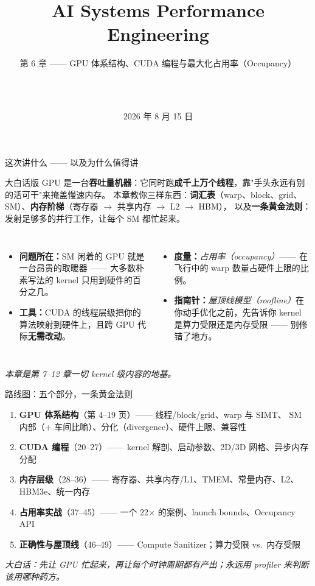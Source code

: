 \documentclass[aspectratio=169]{beamer}
\title[AI Systems Performance Engineering]{AI Systems Performance Engineering}
\subtitle{第 6 章 —— GPU 体系结构、CUDA 编程与最大化占用率（Occupancy）}
\author[\PresenterName\ \ \PresenterTitle\ \ \PresenterOrg]{\PresenterName\\\PresenterTitle\\\PresenterOrg}
\institute[]{\footnotesize 面向应用科学家的 AI 基础设施内部培训}
\date{2026 年 8 月 15 日}
\newcommand{\kw}[1]{\textbf{\textcolor{kwblue}{#1}}}
\newcommand{\pe}[1]{{\footnotesize\itshape 大白话：#1}}
\begin{document}
\begin{frame}
  \titlepage
\end{frame}

\begin{frame}{这次讲什么 —— 以及为什么值得讲}
  \begin{block}{大白话版}
    GPU 是一台\kw{吞吐量机器}：它同时跑\kw{成千上万个线程}，靠"手头永远有别的活可干"来掩盖慢速内存。
    本章教你三样东西：\kw{词汇表}（warp、block、grid、SM）、\kw{内存阶梯}（寄存器 $\to$ 共享内存 $\to$ L2 $\to$ HBM），
    以及\kw{一条黄金法则}：发射足够多的并行工作，让每个 SM 都忙起来。
  \end{block}
  \begin{columns}[t]
    \begin{itemize}
      \item \kw{问题所在：}SM 闲着的 GPU 就是一台昂贵的取暖器 —— 大多数朴素写法的 kernel
            只用到硬件的百分之几。
      \item \kw{工具：}CUDA 的线程层级把你的算法映射到硬件上，且跨 GPU 代际\kw{无需改动}。
    \end{itemize}
    \begin{itemize}
      \item \kw{度量：}\emph{占用率（occupancy）}—— 在飞行中的 warp 数量占硬件上限的比例。
      \item \kw{指南针：}\emph{屋顶线模型（roofline）}在你动手优化之前，先告诉你 kernel
            是算力受限还是内存受限 —— 别修错了地方。
    \end{itemize}
  \end{columns}
  \medskip
  \centering\footnotesize\itshape
  本章是第 7--12 章一切 kernel 级内容的地基。
\end{frame}

\begin{frame}{路线图：五个部分，一条黄金法则}
  \begin{enumerate}
    \item \kw{GPU 体系结构}（第 4--19 页）—— 线程/block/grid、warp 与 SIMT、
          SM 内部（+ 车间比喻）、分化（divergence）、硬件上限、兼容性
    \item \kw{CUDA 编程}（20--27）—— kernel 解剖、启动参数、2D/3D 网格、异步内存分配
    \item \kw{内存层级}（28--36）—— 寄存器、共享内存/L1、TMEM、常量内存、L2、HBM3e、统一内存
    \item \kw{占用率实战}（37--45）—— 一个 22$\times$ 的案例、launch bounds、Occupancy API
    \item \kw{正确性与屋顶线}（46--49）—— Compute Sanitizer；算力受限 vs.\ 内存受限
  \end{enumerate}
  \medskip
  \pe{先让 GPU 忙起来，再让每个时钟周期都有产出；永远用 profiler 来判断该用哪种药方。}
\end{frame}
\end{document}
